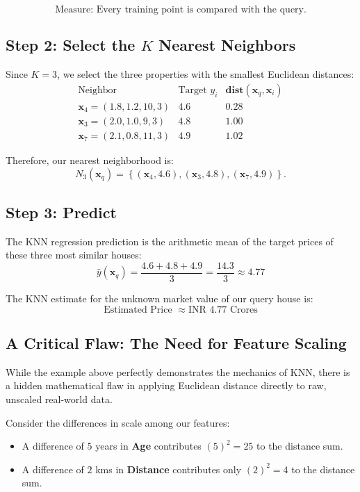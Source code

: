 \documentclass[12pt]{article}
\newcommand{\MVec}[1]{\mathbf{#1}}
\begin{document}
\[
    \boxed{
    \text{Measure: Every training point is compared with the query.}
    }
\]

\subsection*{Step 2: Select the $K$ Nearest Neighbors}
Since $K=3$, we select the three properties with the smallest
Euclidean distances:
\[
    \begin{array}{c|c|c}
        \text{Neighbor} & \text{Target } y_i & \mathbf{dist}(\MVec{x}_q,\MVec{x}_i) \\ \hline
        \MVec{x}_4=(1.8, 1.2, 10, 3) & 4.6 & 0.28 \\
        \MVec{x}_3=(2.0, 1.0, 9, 3) & 4.8 & 1.00 \\
        \MVec{x}_7=(2.1, 0.8, 11, 3) & 4.9 & 1.02
    \end{array}
\]

Therefore, our nearest neighborhood is:
\[
    N_3(\MVec{x}_q) =
    \left\{
        (\MVec{x}_4, 4.6),
        (\MVec{x}_3, 4.8),
        (\MVec{x}_7, 4.9)
    \right\}.
\]

\subsection*{Step 3: Predict}
The KNN regression prediction is the arithmetic mean of the target
prices of these three most similar houses:
\[
    \hat{y}(\MVec{x}_q) = \frac{4.6 + 4.8 + 4.9}{3} = \frac{14.3}{3} \approx 4.77
\]

The KNN estimate for the unknown market value of our
query house is:
\[
    \boxed{
        \text{Estimated Price } \approx \text{INR } 4.77 \text{ Crores}
    }
\]

\newpage

\subsection*{A Critical Flaw: The Need for Feature Scaling}
While the example above perfectly demonstrates the mechanics of KNN,
there is a hidden mathematical flaw in applying Euclidean distance
directly to raw, unscaled real-world data.

Consider the differences in scale among our features:
\begin{itemize}
    \item A difference of $5$ years in \textbf{Age}
          contributes $(5)^2 = 25$ to the distance sum.
    \item A difference of $2$ kms in \textbf{Distance}
          contributes only $(2)^2 = 4$ to the distance sum.
\end{itemize}
\end{document}
